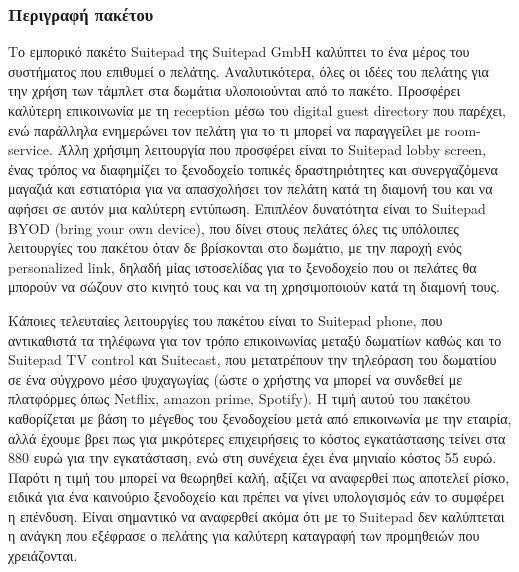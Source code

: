 \subsubsection{Περιγραφή πακέτου}
Το εμπορικό πακέτο Suitepad της Suitepad GmbH καλύπτει το ένα μέρος του συστήματος 
που επιθυμεί ο πελάτης. Αναλυτικότερα, όλες οι ιδέες του πελάτης για την χρήση των 
τάμπλετ στα δωμάτια υλοποιούνται από το πακέτο. Προσφέρει καλύτερη επικοινωνία με 
τη reception μέσω του digital guest directory που παρέχει, ενώ παράλληλα ενημερώνει τον 
πελάτη για το τι μπορεί να παραγγείλει με room-service. Άλλη χρήσιμη λειτουργία που 
προσφέρει είναι το Suitepad lobby screen, ένας τρόπος να διαφημίζει το ξενοδοχείο τοπικές 
δραστηριότητες και συνεργαζόμενα μαγαζιά και εστιατόρια για να απασχολήσει τον πελάτη 
κατά τη διαμονή του και να αφήσει σε αυτόν μια καλύτερη εντύπωση. Επιπλέον δυνατότητα 
είναι το Suitepad BYOD (bring your own device), που δίνει στους πελάτες όλες τις υπόλοιπες 
λειτουργίες του πακέτου όταν δε βρίσκονται στο δωμάτιο, με την παροχή ενός personalized 
link, δηλαδή μίας ιστοσελίδας για το ξενοδοχείο που οι πελάτες θα μπορούν να σώζουν στο 
κινητό τους και να τη χρησιμοποιούν κατά τη διαμονή τους. 

\clearpage 
\noindent
Κάποιες τελευταίες λειτουργίες  του πακέτου είναι το Suitepad phone, που αντικαθιστά τα 
τηλέφωνα για τον τρόπο επικοινωνίας μεταξύ δωματίων καθώς και το Suitepad TV control 
και Suitecast, που μετατρέπουν την τηλεόραση του δωματίου σε ένα σύγχρονο μέσο 
ψυχαγωγίας (ώστε ο χρήστης να μπορεί να συνδεθεί με πλατφόρμες όπως Netflix, amazon 
prime, Spotify). Η τιμή αυτού του πακέτου καθορίζεται με βάση το μέγεθος του ξενοδοχείου 
μετά από επικοινωνία με την εταιρία, αλλά έχουμε βρει πως για μικρότερες επιχειρήσεις το 
κόστος εγκατάστασης τείνει στα 880 ευρώ για την εγκατάσταση, ενώ στη συνέχεια έχει ένα 
μηνιαίο κόστος 55 ευρώ. Παρότι η τιμή του μπορεί να θεωρηθεί καλή, αξίζει να αναφερθεί 
πως αποτελεί ρίσκο, ειδικά για ένα καινούριο ξενοδοχείο και πρέπει να γίνει υπολογισμός 
εάν το συμφέρει η επένδυση. Είναι σημαντικό να αναφερθεί ακόμα ότι με το Suitepad δεν 
καλύπτεται η ανάγκη που εξέφρασε ο πελάτης για καλύτερη καταγραφή των προμηθειών 
που χρειάζονται. \\

